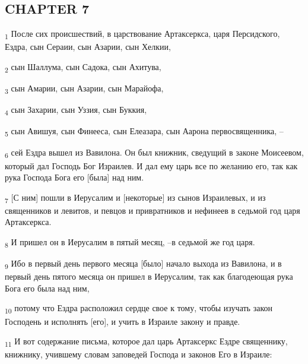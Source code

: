 \subsection{CHAPTER 7}
\begin{tcolorbox}
\textsubscript{1} После сих происшествий, в царствование Артаксеркса, царя Персидского, Ездра, сын Сераии, сын Азарии, сын Хелкии,
\end{tcolorbox}
\begin{tcolorbox}
\textsubscript{2} сын Шаллума, сын Садока, сын Ахитува,
\end{tcolorbox}
\begin{tcolorbox}
\textsubscript{3} сын Амарии, сын Азарии, сын Марайофа,
\end{tcolorbox}
\begin{tcolorbox}
\textsubscript{4} сын Захарии, сын Уззия, сын Буккия,
\end{tcolorbox}
\begin{tcolorbox}
\textsubscript{5} сын Авишуя, сын Финееса, сын Елеазара, сын Аарона первосвященника, --
\end{tcolorbox}
\begin{tcolorbox}
\textsubscript{6} сей Ездра вышел из Вавилона. Он был книжник, сведущий в законе Моисеевом, который дал Господь Бог Израилев. И дал ему царь все по желанию его, так как рука Господа Бога его [была] над ним.
\end{tcolorbox}
\begin{tcolorbox}
\textsubscript{7} [С ним] пошли в Иерусалим и [некоторые] из сынов Израилевых, и из священников и левитов, и певцов и привратников и нефинеев в седьмой год царя Артаксеркса.
\end{tcolorbox}
\begin{tcolorbox}
\textsubscript{8} И пришел он в Иерусалим в пятый месяц, --в седьмой же год царя.
\end{tcolorbox}
\begin{tcolorbox}
\textsubscript{9} Ибо в первый день первого месяца [было] начало выхода из Вавилона, и в первый день пятого месяца он пришел в Иерусалим, так как благодеющая рука Бога его была над ним,
\end{tcolorbox}
\begin{tcolorbox}
\textsubscript{10} потому что Ездра расположил сердце свое к тому, чтобы изучать закон Господень и исполнять [его], и учить в Израиле закону и правде.
\end{tcolorbox}
\begin{tcolorbox}
\textsubscript{11} И вот содержание письма, которое дал царь Артаксеркс Ездре священнику, книжнику, учившему словам заповедей Господа и законов Его в Израиле:
\end{tcolorbox}
